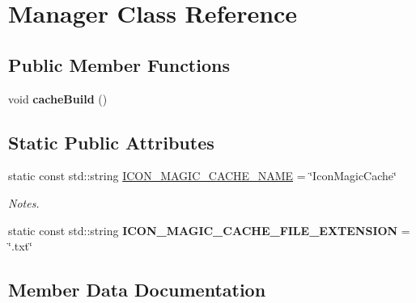 \hypertarget{class_manager}{}\section{Manager Class Reference}
\label{class_manager}
\subsection*{Public Member Functions}
\begin{DoxyCompactItemize}
\item 
\hypertarget{class_manager_a2c59a2449e7764f3afb174be45c871a4}{}void {\bfseries cache\+Build} ()\label{class_manager_a2c59a2449e7764f3afb174be45c871a4}

\end{DoxyCompactItemize}
\subsection*{Static Public Attributes}
\begin{DoxyCompactItemize}
\item 
static const std\+::string \hyperlink{class_manager_a41184c50adeb476a9ccf55e4f3e739e9}{I\+C\+O\+N\+\_\+\+M\+A\+G\+I\+C\+\_\+\+C\+A\+C\+H\+E\+\_\+\+N\+A\+M\+E} = \char`\"{}Icon\+Magic\+Cache\char`\"{}
\begin{DoxyCompactList}\small\item\em Notes. \end{DoxyCompactList}\item 
\hypertarget{class_manager_af3790b888df47ee6a9d3feac2423cc86}{}static const std\+::string {\bfseries I\+C\+O\+N\+\_\+\+M\+A\+G\+I\+C\+\_\+\+C\+A\+C\+H\+E\+\_\+\+F\+I\+L\+E\+\_\+\+E\+X\+T\+E\+N\+S\+I\+O\+N} = \char`\"{}.txt\char`\"{}\label{class_manager_af3790b888df47ee6a9d3feac2423cc86}

\end{DoxyCompactItemize}


\subsection{Member Data Documentation}
\hypertarget{class_manager_a41184c50adeb476a9ccf55e4f3e739e9}{}
